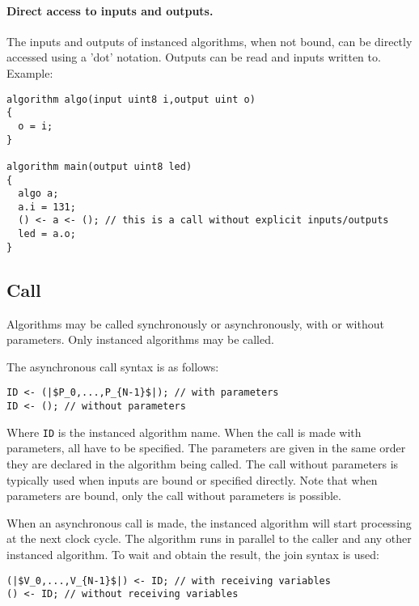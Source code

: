 \documentclass[a4]{article}
\newcommand\todo[1]{{\color{magenta}\textbf{TODO:} #1}}
\begin{document}
\paragraph{Direct access to inputs and outputs.}

The inputs and outputs of instanced algorithms, when not bound,
can be directly accessed using a 'dot' notation. Outputs can be read
and inputs written to.
Example:

\begin{verbatim}
algorithm algo(input uint8 i,output uint o)
{
  o = i;
}

algorithm main(output uint8 led)
{
  algo a;
  a.i = 131;
  () <- a <- (); // this is a call without explicit inputs/outputs
  led = a.o;
}
\end{verbatim}







\subsection{Call}

Algorithms may be called synchronously or asynchronously, with or without parameters. Only instanced algorithms may be called.

The asynchronous call syntax is as follows:
\begin{verbatim}
ID <- (|$P_0,...,P_{N-1}$|); // with parameters
ID <- (); // without parameters
\end{verbatim}
Where \texttt{ID} is the instanced algorithm name.
When the call is made with parameters, all have to be specified. The parameters
are given in the same order they are declared in the algorithm being called.
The call without parameters is typically used when inputs are bound or specified
directly. Note that when parameters are bound, only the call without parameters
is possible.

When an asynchronous call is made, the instanced algorithm will start processing at the next clock cycle. The algorithm runs in parallel to the caller and any other instanced algorithm. To wait and obtain the result, the join syntax is used:

\begin{verbatim}
(|$V_0,...,V_{N-1}$|) <- ID; // with receiving variables
() <- ID; // without receiving variables
\end{verbatim}
\end{document}
